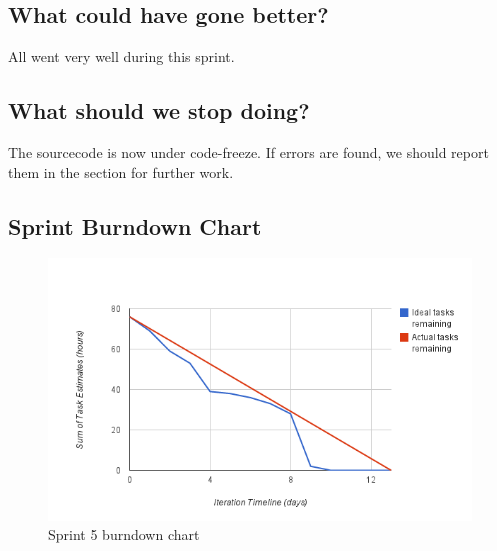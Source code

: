 \subsection{What could have gone better?}
All went very well during this sprint. 

\subsection{What should we stop doing?}
The sourcecode is now under code-freeze. If errors are found, we should report them in the section for further work. 

\subsection{Sprint Burndown Chart}

\begin{figure}
	\begin{center}
		\includegraphics[width=15cm]{Pictures/Charts/Sprint5burndown}
	\end{center}
	\caption{Sprint 5 burndown chart}
	\label{fig:sprint5burndown}
\end{figure}

